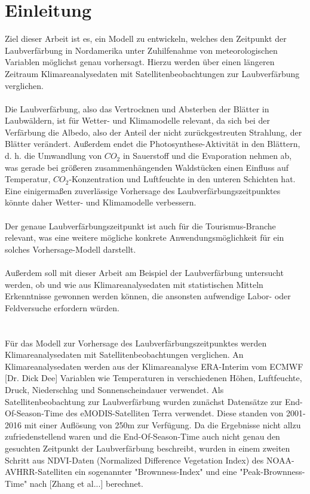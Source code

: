 \documentclass[]{article}
\begin{document}
\tableofcontents
\newpage
\section{Einleitung}


Ziel dieser Arbeit ist es, ein Modell zu entwickeln, welches den Zeitpunkt der Laubverfärbung in Nordamerika unter Zuhilfenahme von meteorologischen Variablen möglichst genau vorhersagt. Hierzu werden über einen längeren Zeitraum Klimareanalysedaten mit Satellitenbeobachtungen zur Laubverfärbung verglichen.
\\ \\
Die Laubverfärbung, also das Vertrocknen und Absterben der Blätter in Laubwäldern, ist für Wetter- und Klimamodelle relevant, da sich bei der Verfärbung die Albedo, also der Anteil der nicht zurückgestreuten Strahlung, der Blätter verändert. Außerdem endet die Photosynthese-Aktivität in den Blättern, d. h. die Umwandlung von $CO_2$ in Sauerstoff und die Evaporation nehmen ab, was gerade bei größeren zusammenhängenden Waldstücken einen Einfluss auf Temperatur, $CO_2$-Konzentration und Luftfeuchte in den unteren Schichten hat. Eine einigermaßen zuverlässige Vorhersage des Laubverfärbungszeitpunktes könnte daher Wetter- und Klimamodelle verbessern.
\\ \\
Der genaue Laubverfärbungszeitpunkt ist auch für die Tourismus-Branche relevant, was eine weitere mögliche konkrete Anwendungsmöglichkeit für ein solches Vorhersage-Modell darstellt.
\\ \\
Außerdem soll mit dieser Arbeit am Beispiel der Laubverfärbung untersucht werden, ob und wie aus Klimareanalysedaten mit statistischen Mitteln Erkenntnisse gewonnen werden können, die ansonsten aufwendige Labor- oder Feldversuche erfordern würden.
\\ \\ \\
Für das Modell zur Vorhersage des Laubverfärbungszeitpunktes werden Klimareanalysedaten mit Satellitenbeobachtungen verglichen. An Klimareanalysedaten werden aus der Klimareanalyse ERA-Interim vom ECMWF [Dr. Dick Dee] Variablen wie Temperaturen in verschiedenen Höhen, Luftfeuchte, Druck, Niederschlag und Sonnenscheindauer verwendet. Als Satellitenbeobachtung zur Laubverfärbung wurden zunächst Datensätze zur End-Of-Season-Time des eMODIS-Satelliten Terra verwendet. Diese standen von 2001-2016 mit einer Auflösung von 250m zur Verfügung. Da die Ergebnisse nicht allzu zufriedenstellend waren und die End-Of-Season-Time auch nicht genau den gesuchten Zeitpunkt der Laubverfärbung beschreibt, wurden in einem zweiten Schritt aus NDVI-Daten (Normalized Difference Vegetation Index) des NOAA-AVHRR-Satelliten ein sogenannter "Brownness-Index" und eine "Peak-Brownness-Time" nach [Zhang et al...] berechnet. 
\end{document}
